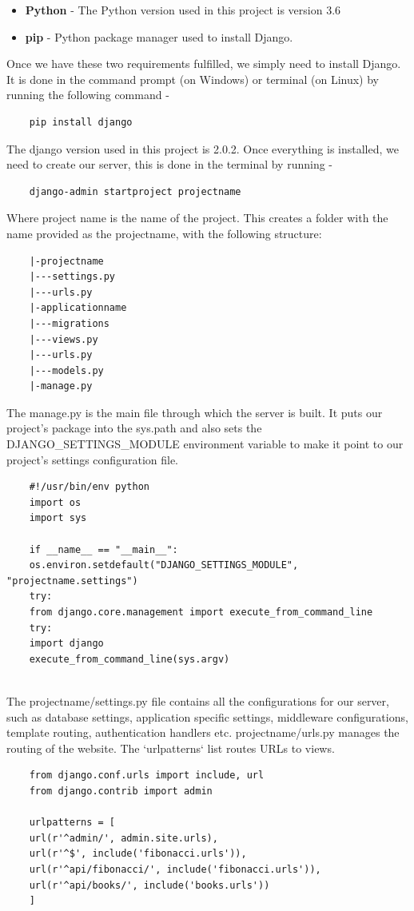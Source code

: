 \documentclass[../thesis.tex]{subfiles}
\begin{document}
	\begin{itemize}
		\item \textbf{Python} - The Python version used in this project is version 3.6
		\smallskip
		\item \textbf{pip} - Python package manager used to install Django.
	\end{itemize}
	Once we have these two requirements fulfilled, we simply need to install Django. It is done in the command prompt (on Windows) or terminal (on Linux) by running the following command -
	\begin{verbatim}
	pip install django
	\end{verbatim}
	The django version used in this project is 2.0.2.
	Once everything is installed, we need to create our server, this is done in the terminal by running - 
	\begin{verbatim}
	django-admin startproject projectname
	\end{verbatim}
	Where project name is the name of the project. This creates a folder with the name provided as the projectname, with the following structure:
	\begin{verbatim}
	|-projectname
	|---settings.py
	|---urls.py
	|-applicationname
	|---migrations
	|---views.py
	|---urls.py
	|---models.py
	|-manage.py
	\end{verbatim}
	The manage.py is the main file through which the server is built. It puts our project's package into the sys.path and also sets the DJANGO\_SETTINGS\_MODULE environment variable to make it point to our project's settings configuration file.
	\begin{verbatim}
	#!/usr/bin/env python
	import os
	import sys
	
	if __name__ == "__main__":
	os.environ.setdefault("DJANGO_SETTINGS_MODULE", "projectname.settings")
	try:
	from django.core.management import execute_from_command_line
	try:
	import django
	execute_from_command_line(sys.argv)
	
	\end{verbatim}
	The projectname/settings.py file contains all the configurations for our server, such as database settings, application specific settings, middleware configurations, template routing, authentication handlers etc. projectname/urls.py manages the routing of the website. The `urlpatterns` list routes URLs to views.
	\begin{verbatim}
	from django.conf.urls import include, url
	from django.contrib import admin
	
	urlpatterns = [
	url(r'^admin/', admin.site.urls),
	url(r'^$', include('fibonacci.urls')),
	url(r'^api/fibonacci/', include('fibonacci.urls')),
	url(r'^api/books/', include('books.urls'))
	]	
	\end{verbatim}
\end{document}
